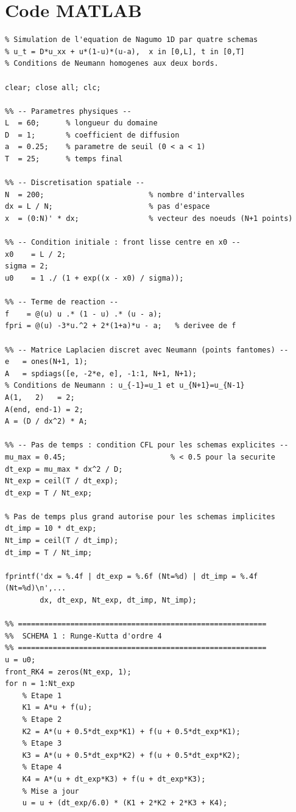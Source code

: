 \documentclass[11pt,a4paper]{report}
\begin{document}
\chapter{Code MATLAB}
\begin{lstlisting}[style=matlabstyle,caption={Script MATLAB principal : nagumo\_simulation.m}]
%% nagumo_simulation.m
% Simulation de l'equation de Nagumo 1D par quatre schemas
% u_t = D*u_xx + u*(1-u)*(u-a),  x in [0,L], t in [0,T]
% Conditions de Neumann homogenes aux deux bords.

clear; close all; clc;

%% -- Parametres physiques --
L  = 60;      % longueur du domaine
D  = 1;       % coefficient de diffusion
a  = 0.25;    % parametre de seuil (0 < a < 1)
T  = 25;      % temps final

%% -- Discretisation spatiale --
N  = 200;                        % nombre d'intervalles
dx = L / N;                      % pas d'espace
x  = (0:N)' * dx;                % vecteur des noeuds (N+1 points)

%% -- Condition initiale : front lisse centre en x0 --
x0    = L / 2;
sigma = 2;
u0    = 1 ./ (1 + exp((x - x0) / sigma));

%% -- Terme de reaction --
f    = @(u) u .* (1 - u) .* (u - a);
fpri = @(u) -3*u.^2 + 2*(1+a)*u - a;   % derivee de f

%% -- Matrice Laplacien discret avec Neumann (points fantomes) --
e   = ones(N+1, 1);
A   = spdiags([e, -2*e, e], -1:1, N+1, N+1);
% Conditions de Neumann : u_{-1}=u_1 et u_{N+1}=u_{N-1}
A(1,   2)   = 2;
A(end, end-1) = 2;
A = (D / dx^2) * A;

%% -- Pas de temps : condition CFL pour les schemas explicites --
mu_max = 0.45;                        % < 0.5 pour la securite
dt_exp = mu_max * dx^2 / D;
Nt_exp = ceil(T / dt_exp);
dt_exp = T / Nt_exp;

% Pas de temps plus grand autorise pour les schemas implicites
dt_imp = 10 * dt_exp;
Nt_imp = ceil(T / dt_imp);
dt_imp = T / Nt_imp;

fprintf('dx = %.4f | dt_exp = %.6f (Nt=%d) | dt_imp = %.4f (Nt=%d)\n',...
        dx, dt_exp, Nt_exp, dt_imp, Nt_imp);

%% =========================================================
%%  SCHEMA 1 : Runge-Kutta d'ordre 4
%% =========================================================
u = u0;
front_RK4 = zeros(Nt_exp, 1);
for n = 1:Nt_exp
    % Etape 1
    K1 = A*u + f(u);
    % Etape 2
    K2 = A*(u + 0.5*dt_exp*K1) + f(u + 0.5*dt_exp*K1);
    % Etape 3
    K3 = A*(u + 0.5*dt_exp*K2) + f(u + 0.5*dt_exp*K2);
    % Etape 4
    K4 = A*(u + dt_exp*K3) + f(u + dt_exp*K3);
    % Mise a jour
    u = u + (dt_exp/6.0) * (K1 + 2*K2 + 2*K3 + K4);
    

\end{lstlisting}
\end{document}
